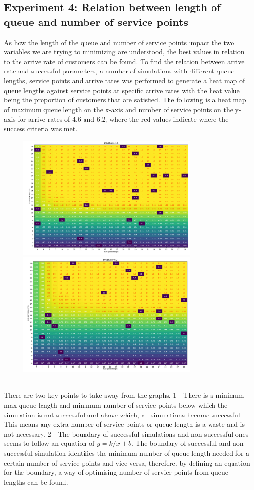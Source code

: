 \documentclass{article}
\begin{document}
\subsection{Experiment 4: Relation between length of queue and number of service points}
As how the length of the queue and number of service points impact the two variables we are trying to minimizing are understood, the best values in relation to the arrive rate of customers can be found. To find the relation between arrive rate and successful parameters, a number of simulations with different queue lengths, service points and arrive rates was performed to generate a heat map of queue lengths against service points at specific arrive rates with the heat value being the proportion of customers that are satisfied.
The following is a heat map of maximum queue length on the x-axis and number of service points on the y-axis for arrive rates of 4.6 and 6.2, where the red values indicate where the success criteria was met.
\begin{figure}[h]
\includegraphics[width=9cm]{heat_map_4-6.png}
\includegraphics[width=9cm]{heat_map_6-2.png}
\end{figure}
\\
There are two key points to take away from the graphs. 1 - There is a minimum max queue length and minimum number of service points below which the simulation is not successful and above which, all simulations become successful. This means any extra number of service points or queue length is a waste and is not necessary. 2 - The boundary of successful simulations and non-successful ones seems to follow an equation of \(y=k/x + b\). The boundary of  successful and non-successful simulation identifies the minimum number of queue length needed for a certain number of service points and vice versa, therefore, by defining an equation for the boundary, a way of optimising number of service points from queue lengths can be found.
\end{document}
